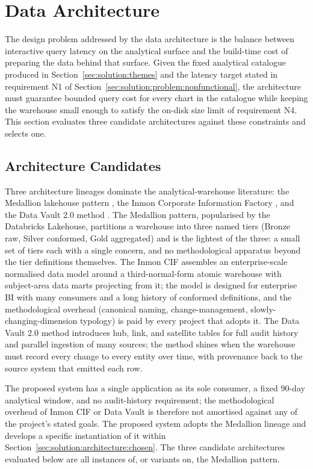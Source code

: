 \section{Data Architecture}
\label{sec:solution:architecture}

The design problem addressed by the data architecture is the balance between
interactive query latency on the analytical surface and the build-time cost
of preparing the data behind that surface. Given the fixed analytical
catalogue produced in Section~\ref{sec:solution:themes} and the latency
target stated in requirement N1 of
Section~\ref{sec:solution:problem:nonfunctional}, the architecture must
guarantee bounded query cost for every chart in the catalogue while keeping
the warehouse small enough to satisfy the on-disk size limit of requirement
N4. This section evaluates three candidate architectures against these
constraints and selects one.

\subsection{Architecture Candidates}
\label{sec:solution:architecture:candidates}

Three architecture lineages dominate the analytical-warehouse
literature: the Medallion lakehouse pattern
\cite{databricksMedallion}, the Inmon Corporate Information Factory
\cite{inmon2008cif}, and the Data Vault 2.0 method
\cite{linstedt2015dv}. The Medallion pattern, popularised by the
Databricks Lakehouse, partitions a warehouse into three named tiers
(Bronze raw, Silver conformed, Gold aggregated) and is the lightest
of the three: a small set of tiers each with a single concern, and no
methodological apparatus beyond the tier definitions themselves. The
Inmon CIF assembles an enterprise-scale normalised data model around
a third-normal-form atomic warehouse with subject-area data marts
projecting from it; the model is designed for enterprise BI with many
consumers and a long history of conformed definitions, and the
methodological overhead (canonical naming, change-management,
slowly-changing-dimension typology) is paid by every project that
adopts it. The Data Vault 2.0 method introduces hub, link, and
satellite tables for full audit history and parallel ingestion of
many sources; the method shines when the warehouse must record every
change to every entity over time, with provenance back to the
source system that emitted each row.

The proposed system has a single application as its sole consumer, a
fixed 90-day analytical window, and no audit-history requirement;
the methodological overhead of Inmon CIF or Data Vault is therefore
not amortised against any of the project's stated goals. The
proposed system adopts the Medallion lineage and develops a specific
instantiation of it within Section~\ref{sec:solution:architecture:chosen}.
The three candidate architectures evaluated below are all instances
of, or variants on, the Medallion pattern.

